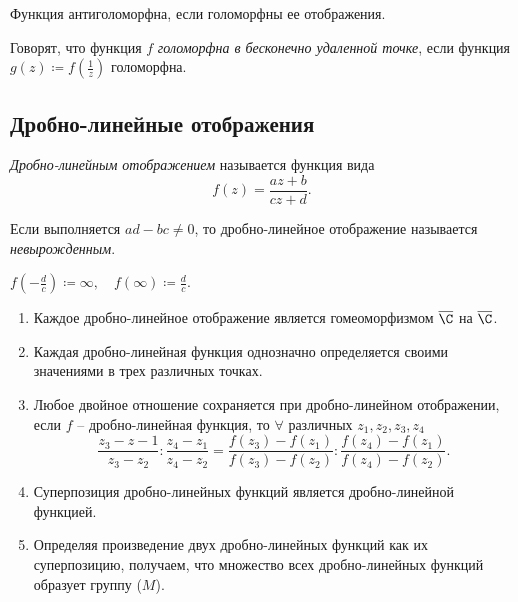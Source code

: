 \begin{remark}
	Функция антиголоморфна, если голоморфны ее отображения.
\end{remark}

\begin{definition}
	Говорят, что функция $f$ \emph{голоморфна в бесконечно удаленной точке}, если функция $g(z)\coloneq f \left(\frac{1}{z} \right)$ голоморфна.
\end{definition}

\subsection{Дробно-линейные отображения}

\begin{definition}
	\emph{Дробно-линейным отображением} называется функция вида
	\[
		f(z) = \frac{az + b}{cz + d}.
	\]

	Если выполняется $ad - bc \ne 0$, то дробно-линейное отображение называется \emph{невырожденным}.
\end{definition}

\begin{eg}
	$f \left(-\frac{d}{c} \right) \coloneq  \infty , \quad f(\infty ) \coloneq \frac{d}{c} $.
\end{eg}

\begin{theorem}\leavevmode
	\begin{enumerate}
		\item Каждое дробно-линейное отображение является гомеоморфизмом $\overline{\C} $ на $\overline{\C} $.
		\item Каждая дробно-линейная функция однозначно определяется своими значениями в трех различных точках.
		\item Любое двойное отношение сохраняется при дробно-линейном отображении, если $f$ -- дробно-линейная функция, то $\forall $ различных $z_1,z_2,z_3,z_4$
		      \[
			      \frac{z_3 - z-1}{z_3 - z_2} : \frac{z_4 - z_1}{z_4 - z_2} = \frac{f(z_3) - f(z_1)}{f(z_3) - f(z_2)} : \frac{f(z_4) - f(z_1)}{f(z_4) - f(z_2)} .
		      \]

		\item Суперпозиция дробно-линейных функций является дробно-линейной функцией.
		\item Определяя произведение двух дробно-линейных функций как их суперпозицию, получаем, что множество всех дробно-линейных функций образует группу ($M$).
	\end{enumerate}
\end{theorem}

